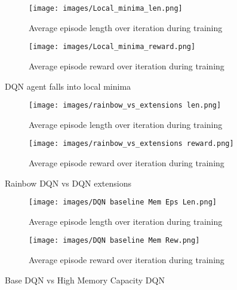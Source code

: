 \documentclass{article}
\begin{document}
\begin{figure}[h!]
    \centering
    \begin{subfigure}{0.9\textwidth}
        \centering
        \texttt{[image: images/Local\_minima\_len.png]}
        \caption{Average episode length over iteration during training}
        \label{fig:Local_minima_episodelen}
    \end{subfigure}
    \begin{subfigure}{0.9\textwidth}
        \centering
        \texttt{[image: images/Local\_minima\_reward.png]}
        \caption{Average episode reward over iteration during training}
        \label{fig:PPO-300-train-reward}
    \end{subfigure}
    \caption{DQN agent falls into local minima}
    \label{fig:local_minima}
\end{figure}

\begin{figure}[h!]
    \centering
    \begin{subfigure}{0.9\textwidth}
        \centering
        \texttt{[image: images/rainbow\_vs\_extensions len.png]}
        \caption{Average episode length over iteration during training}
        \label{fig:RDQN_vs_DQN_extention_episodelen}
    \end{subfigure}
    \begin{subfigure}{0.9\textwidth}
        \centering
        \texttt{[image: images/rainbow\_vs\_extensions reward.png]}
        \caption{Average episode reward over iteration during training}
        \label{fig:RDQN_vs_DQN_extention-reward}
    \end{subfigure}
    \caption{Rainbow DQN vs DQN extensions}
    \label{fig:RDQN_VS_DQN}
\end{figure}

\begin{figure}[h!]
    \centering
    \begin{subfigure}{0.9\textwidth}
        \centering
        \texttt{[image: images/DQN baseline Mem Eps Len.png]}
        \caption{Average episode length over iteration during training}
        \label{fig:Base_DQN_vs_highMEM_DQN-episode}
    \end{subfigure}
    \begin{subfigure}{0.9\textwidth}
        \centering
        \texttt{[image: images/DQN baseline Mem Rew.png]}
        \caption{Average episode reward over iteration during training}
        \label{fig::Base_DQN_vs_highMEM_DQN-reward}
    \end{subfigure}
    \caption{Base DQN vs High Memory Capacity DQN}
    \label{fig:Base_DQN_vs_highMEM_DQN}
\end{figure}
\end{document}

